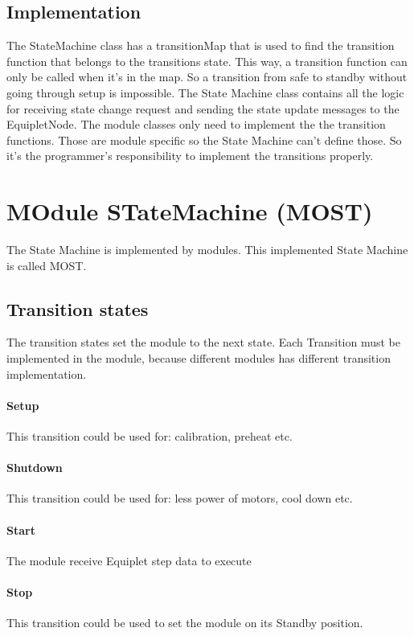 \documentclass[12pt,a4paper]{report}
\begin{document}
\subsection{Implementation}
The StateMachine class has a transitionMap that is used to find the transition function that belongs to the transitions state. This way, a transition function can only be called when it’s in the map. So a transition from safe to standby without going through setup is impossible. The State Machine class contains all the logic for receiving state change request and sending the state update messages to the EquipletNode. The module classes only need to implement the the transition functions. Those are module specific so the State Machine can’t define those. So it’s the programmer’s responsibility to implement the transitions properly.\cite{mast_technical_design}

\newpage
\section{MOdule STateMachine (MOST)}
The State Machine is implemented by modules. This implemented State Machine is called MOST.

\subsection{Transition states}
The transition states set the module to the next state. Each Transition must be implemented in the module, because different modules has different transition implementation.

\paragraph{Setup}This transition could be used for: calibration, preheat etc.
\paragraph{Shutdown}This transition could be used for: less power of motors, cool down etc.
\paragraph{Start}The module receive Equiplet step data to execute
\paragraph{Stop}This transition could be used to set the module on its Standby position.
\end{document}
